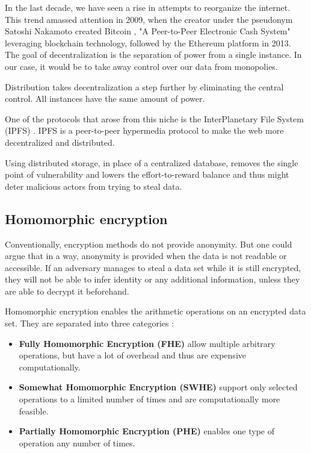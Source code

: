 In the last decade, we have seen a rise in attempts to reorganize the internet. This trend amassed attention in 2009, when the creator under the pseudonym Satoshi Nakamoto created Bitcoin
, "A Peer-to-Peer Electronic Cash System" leveraging blockchain technology, followed by the Ethereum
platform in 2013.
The goal of decentralization is the separation of power from a single instance. In our case, it would be to take away control over our data from monopolies. 

Distribution takes decentralization a step further by eliminating the central control. All instances have the same amount of power.

One of the protocols that arose from this niche is the InterPlanetary File System (IPFS)
. IPFS is a peer-to-peer hypermedia protocol to make the web more decentralized and distributed.


Using distributed storage, in place of a centralized database, removes the single point of vulnerability and lowers the effort-to-reward balance and thus might deter malicious actors from trying to steal data.

\subsection{Homomorphic encryption}
Conventionally, encryption methods do not provide anonymity. But one could argue that in a way, anonymity is provided when the data is not readable or accessible. If an adversary manages to steal a data set while it is still encrypted, they will not be able to infer identity or any additional information, unless they are able to decrypt it beforehand. 

Homomorphic encryption enables the arithmetic operations on an encrypted data set. They are separated into three categories
:
\begin{itemize}
    \item \textbf{Fully Homomorphic Encryption (FHE)} allow multiple arbitrary operations, but have a lot of overhead and thus are expensive computationally.
    \item \textbf{Somewhat Homomorphic Encryption (SWHE)} support only selected operations to a limited number of times and are computationally more feasible.
    \item \textbf{Partially Homomorphic Encryption (PHE)} enables one type of operation any number of times.
\end{itemize}

